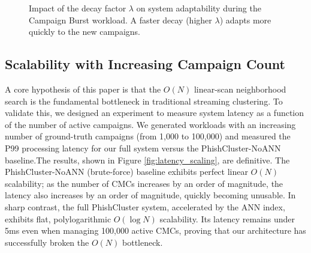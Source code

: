 \documentclass[journal,article,submit,pdftex,moreauthors]{Definitions/mdpi}
\begin{document}
\begin{figure}[h!]
\centering
{}
\caption{Impact of the decay factor $\lambda$ on system adaptability during the Campaign Burst workload. A faster decay (higher $\lambda$) adapts more quickly to the new campaigns.}
\label{fig:lambda_burst}
\end{figure}



\subsection{Scalability with Increasing Campaign Count}
A core hypothesis of this paper is that the $O(N)$ linear-scan neighborhood search is the fundamental bottleneck in traditional streaming clustering. To validate this, we designed an experiment to measure system latency as a function of the number of active campaigns. We generated workloads with an increasing number of ground-truth campaigns (from 1,000 to 100,000) and measured the P99 processing latency for our full system versus the PhishCluster-NoANN baseline.The results, shown in Figure \ref{fig:latency_scaling}, are definitive. The PhishCluster-NoANN (brute-force) baseline exhibits perfect linear $O(N)$ scalability; as the number of CMCs increases by an order of magnitude, the latency also increases by an order of magnitude, quickly becoming unusable. In sharp contrast, the full PhishCluster system, accelerated by the ANN index, exhibits flat, polylogarithmic $O(\log N)$ scalability. Its latency remains under 5ms even when managing 100,000 active CMCs, proving that our architecture has successfully broken the $O(N)$ bottleneck.
\end{document}
